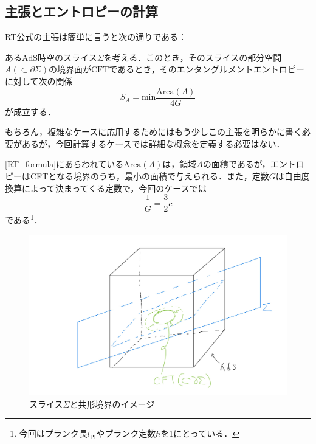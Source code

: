 \documentclass[a4paper,uplatex,dvipdfmx]{jsarticle}
\theoremstyle{definition}
\begin{document}
\subsection{主張とエントロピーの計算}

RT公式の主張は簡単に言うと次の通りである：

\begin{flushleft}
  ある$\text{AdS}$時空のスライス$\Sigma$を考える．このとき，そのスライスの部分空間$A(\subset \partial\Sigma)$の境界面が$\text{CFT}$であるとき，そのエンタングルメントエントロピーに対して次の関係
  \begin{equation}
    S_{A}
    =
    \text{min}
    \frac{\text{Area}(A)}{4G}
    \label{RT_formula}
  \end{equation}
  が成立する．
\end{flushleft}

もちろん，複雑なケースに応用するためにはもう少しこの主張を明らかに書く必要があるが，今回計算するケースでは詳細な概念を定義する必要はない．

\eqref{RT_formula}にあらわれている$\text{Area}(A)$は，領域$A$の面積であるが，エントロピーはCFTとなる境界のうち，最小の面積で与えられる．また，定数$G$は自由度換算によって決まってくる定数で，今回のケースでは
\begin{equation}
  \frac{1}{G}
  =
  \frac{3}{2}c
  \label{constant_G}
\end{equation}
である\footnote{
  今回はプランク長$l_{\text{Pl}}$やプランク定数$\hbar$を1にとっている．
}．

\begin{figure}[ht]
  \centering
  \includegraphics[keepaspectratio,width=0.8\linewidth]{fig/cft_boundary.jpg}
  \caption{スライス$\Sigma$と共形境界のイメージ}
\end{figure}
\end{document}

